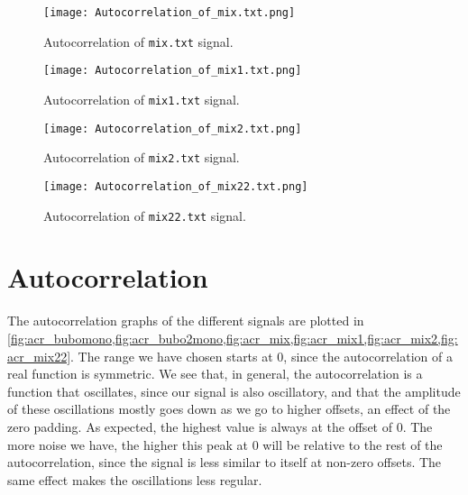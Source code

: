 \documentclass[10pt,a4paper,twocolumn]{article}
\begin{document}
\begin{figure}
\centering
\captionsetup{justification=centering}
\texttt{[image: Autocorrelation\_of\_mix.txt.png]}
\caption{Autocorrelation of \texttt{mix.txt} signal.}
\label{fig:acr_mix}
\end{figure}

\begin{figure}
\centering
\captionsetup{justification=centering}
\texttt{[image: Autocorrelation\_of\_mix1.txt.png]}
\caption{Autocorrelation of \texttt{mix1.txt} signal.}
\label{fig:acr_mix1}
\end{figure}

\begin{figure}
\centering
\captionsetup{justification=centering}
\texttt{[image: Autocorrelation\_of\_mix2.txt.png]}
\caption{Autocorrelation of \texttt{mix2.txt} signal.}
\label{fig:acr_mix2}
\end{figure}

\begin{figure}
\centering
\captionsetup{justification=centering}
\texttt{[image: Autocorrelation\_of\_mix22.txt.png]}
\caption{Autocorrelation of \texttt{mix22.txt} signal.}
\label{fig:acr_mix22}
\end{figure}


\section{Autocorrelation}
The autocorrelation graphs of the different signals are plotted in \cref{fig:acr_bubomono,fig:acr_bubo2mono,fig:acr_mix,fig:acr_mix1,fig:acr_mix2,fig:acr_mix22}. The range we have chosen starts at $0$, since the autocorrelation of a real function is symmetric. We see that, in general, the autocorrelation is a function that oscillates, since our signal is also oscillatory, and that the amplitude of these oscillations mostly goes down as we go to higher offsets, an effect of the zero padding. As expected, the highest value is always at the offset of $0$. The more noise we have, the higher this peak at $0$ will be relative to the rest of the autocorrelation, since the signal is less similar to itself at non-zero offsets. The same effect makes the oscillations less regular.


\printbibliography
\end{document}
